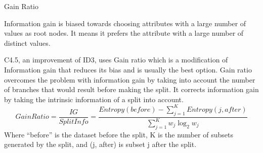\documentclass{beamer}
\begin{document}
\begin{frame}{Gain Ratio}
\begin{flushleft}
	Information gain is biased towards choosing attributes with a large number of values as root nodes. It means it prefers the attribute with a large number of distinct values.

C4.5, an improvement of ID3, uses Gain ratio which is a modification of Information gain that reduces its bias and is usually the best option. Gain ratio overcomes the problem with information gain by taking into account the number of branches that would result before making the split. It corrects information gain by taking the intrinsic information of a split into account.
		\begin{equation*}
			Gain Ratio = \frac{IG}{SplitInfo} = \frac{Entropy(before)-\sum_{j=1}^{K}Entropy(j, after)}{\sum_{j=1}^{K}w_j\log_2w_j}
		\end{equation*}
Where “before” is the dataset before the split, K is the number of subsets generated by the split, and (j, after) is subset j after the split.

	\end{flushleft}
\end{frame}
\end{document}
